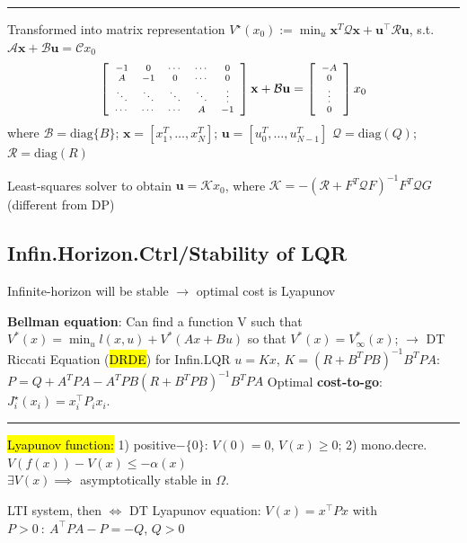 \documentclass[10pt,a4paper,landscape]{article}
\newcommand{\quadRule}{\vspace{-3pt}\rule{0.23\textwidth}{0.4pt}}
\begin{document}
\begin{multicols*}{4}
\quadRule

Transformed into matrix representation $V^{\star}\left(x_{0}\right):=\min _{u} \mathbf{x}^{T} \mathcal{Q} \mathbf{x}+\mathbf{u}^{\top} \mathcal{R} \mathbf{u}$, s.t. $\mathcal{A} \mathbf{x}+\mathcal{B} \mathbf{u}=\mathcal{C} x_{0}$
\begin{equation*}
\scriptsize
\left[\begin{array}{cccccc}
 -1 & 0 & \cdots & \cdots & 0 \\
 A & -1 & 0 & \cdots & 0 \\
 \ddots & \ddots & \ddots & \ddots & \vdots \\
 \cdots & \cdots & \cdots & A & -1
\end{array}\right]
\mathbf{x}
+\mathcal{B}
\mathbf{u}
=\left[\begin{array}{c}
-A \\
0 \\
\vdots \\
0
\end{array}\right] x_0
\end{equation*}
where $\mathcal{B} = \mathrm{diag}\{B\}$; $\mathbf{x} = [x_1^T, \ldots, x_N^T]$; $\mathbf{u} = [u_0^T, \ldots, u_{N-1}^T]$
$\mathcal{Q} = \mathrm{diag}(Q)$;
$\mathcal{R} = \mathrm{diag}(R)$

Least-squares solver to obtain $\mathbf{u} = \mathcal{K} x_0$, where $\mathcal{K} = -(\mathcal{R}+F^T\mathcal{Q}F)^{-1}F^T\mathcal{Q}G$ (different from DP)

\subsection{Infin.Horizon.Ctrl/Stability of LQR}
Infinite-horizon will be stable $\rightarrow$  optimal cost is Lyapunov
 
\textbf{Bellman equation}: Can find a function V such that $V^*(x) = \min_u l(x,u) + V^*(Ax+Bu)$ so that $V^*(x) = V_{\infty}^*(x)$; $\rightarrow$
DT Riccati Equation (\hl{DRDE}) for Infin.LQR $u = K x$, $K = (R+B^TPB)^{-1}B^TPA$:\\
$P = Q + A^TPA - A^TPB(R + B^TPB)^{-1}B^TPA$
Optimal \textbf{cost-to-go}: $J^\star_i(x_i) = x_i^\top P_i x_i$.

\quadRule

\hl{Lyapunov function:} 1) positive$- \{0\}$: $V(0)=0$, $V(x)\geq 0$; 2) mono.decre. $V(f(x)) - V(x) \leq -\alpha(x)$\\
$\exists V(x) \implies$ asymptotically stable in $\Omega$.

LTI system, then $\iff$ DT Lyapunov equation:
$V(x) = x^\top P x$ with $P>0 \: : \: A^\top P A - P = -Q$, $Q>0$


\end{multicols*}
\end{document}
